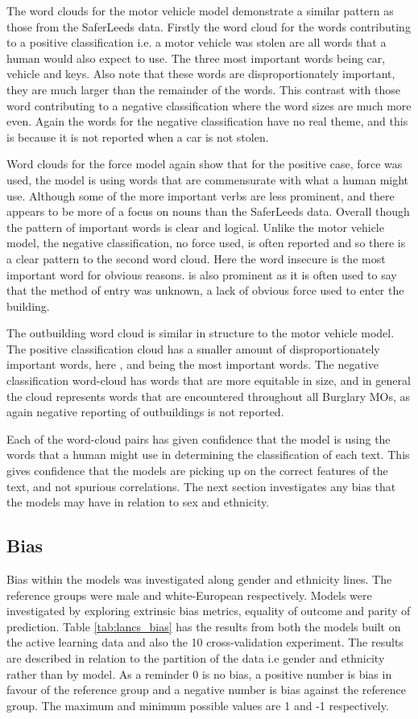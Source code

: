 The word clouds for the motor vehicle model demonstrate a similar pattern as those from the SaferLeeds data. Firstly the word cloud for the words contributing to a positive classification i.e. a motor vehicle was stolen are all words that a human would also expect to use. The three most important words being car, vehicle and keys. Also note that these words are disproportionately important, they are much larger than the remainder of the words. This contrast with those word contributing to a negative classification where the word sizes are much more even. Again the words for the negative classification have no real theme, and this is because it is not reported when a car is not stolen.

Word clouds for the force model again show that for the positive case, force was used, the model is using words that are commensurate with what a human might use. Although some of the more important verbs are less prominent, and there appears to be more of a focus on nouns than the SaferLeeds data. Overall though the pattern of important words is clear and logical. Unlike the motor vehicle model, the negative classification, no force used, is often reported and so there is a clear pattern to the second word cloud. Here the word insecure is the most important word for obvious reasons.  is also prominent as it is often used to say that the method of entry was unknown, a lack of obvious force used to enter the building. 

The outbuilding word cloud is similar in structure to the motor vehicle model. The positive classification cloud has a smaller amount of disproportionately important words, here ,  and  being the most important words. The negative classification word-cloud has words that are more equitable in size, and in general the cloud represents words that are encountered throughout all Burglary MOs, as again negative reporting of outbuildings is not reported. 

Each of the word-cloud pairs has given confidence that the model is using the words that a human might use in determining the classification of each text. This gives confidence that the models are picking up on the correct features of the text, and not spurious correlations. The next section investigates any bias that the models may have in relation to sex and ethnicity.

\subsection{Bias} Bias within the models was investigated along gender and ethnicity lines. The reference groups were male and white-European respectively. Models were investigated by exploring extrinsic bias metrics, equality of outcome and parity of prediction. Table \ref{tab:lancs_bias} has the results from both the models built on the active learning data and also the 10 cross-validation experiment. The results are described in relation to the partition of the data i.e gender and ethnicity rather than by model. As a reminder 0 is no bias, a positive number is bias in favour of the reference group and a negative number is bias against the reference group. The maximum and minimum possible values are 1 and -1 respectively.

